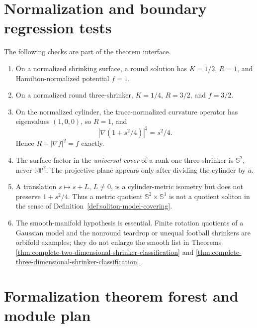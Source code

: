 \documentclass[10pt]{coll-l}
\newcommand{\Sph}{\mathbb{S}}
\theoremstyle{definition}
\theoremstyle{remark}
\numberwithin{section}{chapter}
\numberwithin{equation}{chapter}
\begin{document}
\section{Normalization and boundary regression tests}
\label{sec:shrinker-classification-regression}

The following checks are part of the theorem interface.
\begin{enumerate}
\item On a normalized shrinking surface, a round solution has
      $K=1/2$, $R=1$, and Hamilton-normalized potential $f=1$.
\item On a normalized round three-shrinker, $K=1/4$, $R=3/2$, and
      $f=3/2$.
\item On the normalized cylinder, the trace-normalized curvature operator
      has eigenvalues $(1,0,0)$, so $R=1$, and
      \[
        \left|\nabla\left(1+s^2/4\right)\right|^2=s^2/4.
      \]
      Hence $R+|\nabla f|^2=f$ exactly.
\item The surface factor in the \emph{universal cover} of a rank-one
      three-shrinker is $\Sph^2$, never $\mathbb{RP}^2$.  The projective
      plane appears only after dividing the cylinder by $a$.
\item A translation $s\mapsto s+L$, $L\ne0$, is a cylinder-metric
      isometry but does not preserve $1+s^2/4$.  Thus a metric quotient
      $\Sph^2\times\Sph^1$ is not a quotient soliton in the sense of
      Definition~\ref{def:soliton-model-covering}.
\item The smooth-manifold hypothesis is essential.  Finite rotation
      quotients of a Gaussian model and the nonround teardrop or unequal
      football shrinkers are orbifold examples; they do not enlarge the
      smooth list in Theorems
      \ref{thm:complete-two-dimensional-shrinker-classification} and
      \ref{thm:complete-three-dimensional-shrinker-classification}.
\end{enumerate}

\section{Formalization theorem forest and module plan}
\label{sec:shrinker-classification-formalization}
\end{document}
